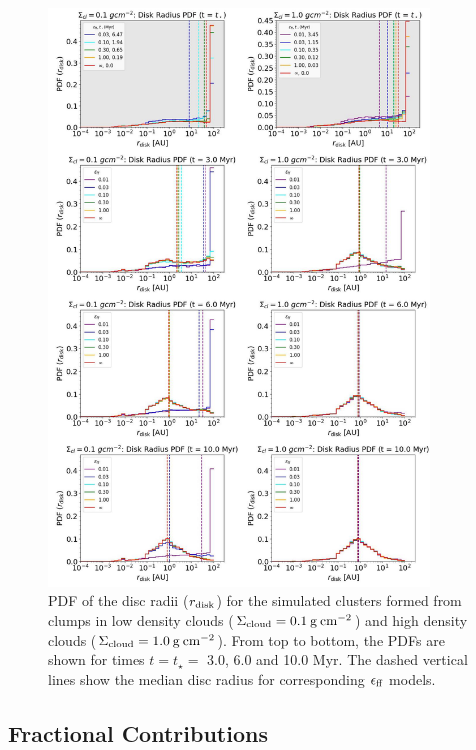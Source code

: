 \documentclass[fleqn,usenatbib]{mnras}
\newcommand\sfeff{\ensuremath{\epsilon_{\rm ff}}\xspace}   %
\newcommand\Sigmacloud{\ensuremath{\Sigma_{\rm cloud}}\xspace} %
\begin{document}
\begin{figure}
    \centering
    \includegraphics[width=0.9\textwidth, height=0.9\textheight]{figures/PanelPDFDiscRadiusEvolution.pdf}
    \caption{PDF of the disc radii ($r_{\rm disk}$) for the simulated clusters formed from clumps in low density clouds ($\Sigmacloud = 0.1\: \rm g\:cm^{-2}$) and high density clouds ($\Sigmacloud = 1.0\:\rm g\: cm^{-2}$). From top to bottom, the PDFs are shown for times $t = t_{\star}=$ 3.0, 6.0 and 10.0 Myr. The dashed vertical lines show the median disc radius for corresponding \sfeff models.}
    \label{fig:diskradiuspdf}
\end{figure}


\subsection{Fractional Contributions}
\label{subsec:fractional_contributions}
\end{document}

